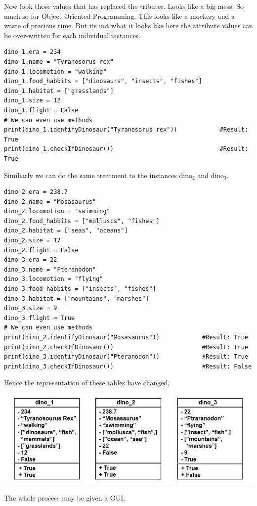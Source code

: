 \documentclass[11pt]{article}
\begin{document}
Now look those values that has replaced the   tributes. Looks like a big mess. So much so for Object Oriented Programming. This looks like a mockery and a waste of precious time. But its not what it looks like here the attribute values can be over-written for each individual instances.
\begin{verbatim}
dino_1.era = 234
dino_1.name = "Tyranosorus rex"
dino_1.locomotion = "walking"
dino_1.food_habbits = ["dinosaurs", "insects", "fishes"]
dino_1.habitat = ["grasslands"]
dino_1.size = 12
dino_1.flight = False
# We can even use methods
print(dino_1.identifyDinosaur("Tyranosorus rex"))            #Result: True
print(dino_1.checkIfDinosaur())                              #Result: True
\end{verbatim}

Similiarly we can do the same treatment to the instances dino\(_{\text{2}}\) and dino\(_{\text{3}}\).


\begin{verbatim}
dino_2.era = 238.7
dino_2.name = "Mosasaurus"
dino_2.locomotion = "swimming"
dino_2.food_habbits = ["molluscs", "fishes"]
dino_2.habitat = ["seas", "oceans"]
dino_2.size = 17
dino_2.flight = False
dino_3.era = 22
dino_3.name = "Pteranodon"
dino_3.locomotion = "flying"
dino_3.food_habbits = ["insects", "fishes"]
dino_3.habitat = ["mountains", "marshes"]
dino_3.size = 9
dino_3.flight = True
# We can even use methods
print(dino_2.identifyDinosaur("Mosasaurus"))            #Result: True
print(dino_2.checkIfDinosaur())                         #Result: True
print(dino_3.identifyDinosaur("Pteranodon"))            #Result: True
print(dino_3.checkIfDinosaur())                         #Result: False
\end{verbatim}

Hence the representation of these tables have changed,


\begin{center}
\includegraphics[width=.9\linewidth]{./img/dino_uml.jpg}
\end{center}


The whole process may be given a GUI.
\end{document}
